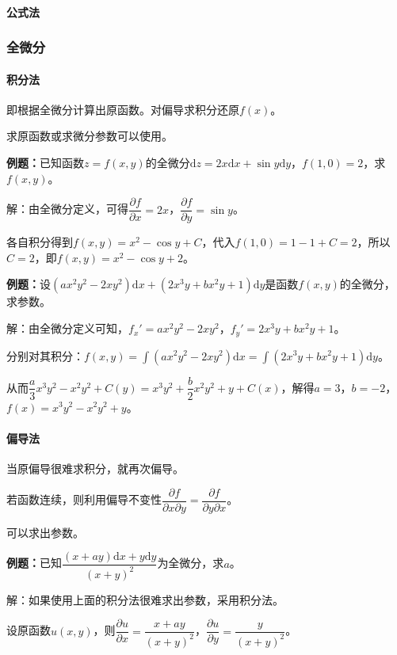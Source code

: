 \documentclass[UTF8, 12pt]{ctexart}
\begin{document}
\paragraph{公式法} \leavevmode \medskip

\subsubsection{全微分}

\paragraph{积分法} \leavevmode \medskip

即根据全微分计算出原函数。对偏导求积分还原$f(x)$。

求原函数或求微分参数可以使用。

\textbf{例题：}已知函数$z=f(x,y)$的全微分$\textrm{d}z=2x\textrm{d}x+\sin y\textrm{d}y$，$f(1,0)=2$，求$f(x,y)$。

解：由全微分定义，可得$\dfrac{\partial f}{\partial x}=2x$，$\dfrac{\partial f}{\partial y}=\sin y$。

各自积分得到$f(x,y)=x^2-\cos y+C$，代入$f(1,0)=1-1+C=2$，所以$C=2$，即$f(x,y)=x^2-\cos y+2$。

\textbf{例题：}设$(ax^2y^2-2xy^2)\textrm{d}x+(2x^3y+bx^2y+1)\textrm{d}y$是函数$f(x,y)$的全微分，求参数。

解：由全微分定义可知，$f_x'=ax^2y^2-2xy^2$，$f_y'=2x^3y+bx^2y+1$。

分别对其积分：$f(x,y)=\int(ax^2y^2-2xy^2)\textrm{d}x=\int(2x^3y+bx^2y+1)\textrm{d}y$。

从而$\dfrac{a}{3}x^3y^2-x^2y^2+C(y)=x^3y^2+\dfrac{b}{2}x^2y^2+y+C(x)$，解得$a=3$，$b=-2$，$f(x)=x^3y^2-x^2y^2+y$。

\paragraph{偏导法} \leavevmode \medskip

当原偏导很难求积分，就再次偏导。

若函数连续，则利用偏导不变性$\dfrac{\partial f}{\partial x\partial y}=\dfrac{\partial f}{\partial y\partial x}$。

可以求出参数。

\textbf{例题：}已知$\dfrac{(x+ay)\textrm{d}x+y\textrm{d}y}{(x+y)^2}$为全微分，求$a$。

解：如果使用上面的积分法很难求出参数，采用积分法。

设原函数$u(x,y)$，则$\dfrac{\partial u}{\partial x}=\dfrac{x+ay}{(x+y)^2}$，$\dfrac{\partial u}{\partial y}=\dfrac{y}{(x+y)^2}$。
\end{document}
